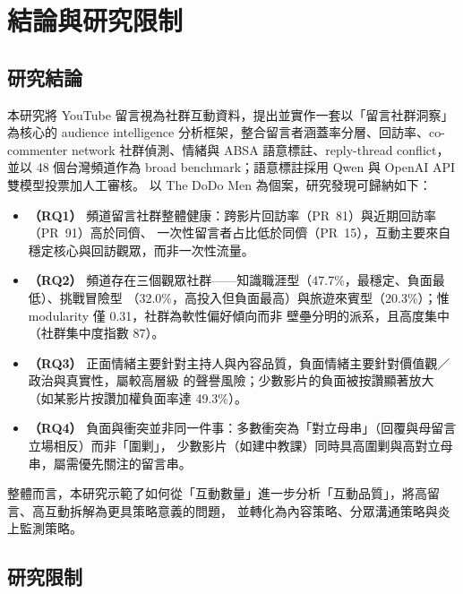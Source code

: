 \section{結論與研究限制}

\subsection{研究結論}

本研究將 YouTube 留言視為社群互動資料，提出並實作一套以「留言社群洞察」為核心的 audience intelligence
分析框架，整合留言者涵蓋率分層、回訪率、co-commenter network 社群偵測、情緒與 ABSA 語意標註、reply-thread
conflict，並以 48 個台灣頻道作為 broad benchmark；語意標註採用 Qwen 與 OpenAI API 雙模型投票加人工審核。
以 The DoDo Men 為個案，研究發現可歸納如下：

\begin{itemize}
  \item \textbf{（RQ1）} 頻道留言社群整體健康：跨影片回訪率（PR~81）與近期回訪率（PR~91）高於同儕、
        一次性留言者占比低於同儕（PR~15），互動主要來自穩定核心與回訪觀眾，而非一次性流量。
  \item \textbf{（RQ2）} 頻道存在三個觀眾社群——知識職涯型（47.7\%，最穩定、負面最低）、挑戰冒險型
        （32.0\%，高投入但負面最高）與旅遊來賓型（20.3\%）；惟 modularity 僅 0.31，社群為軟性偏好傾向而非
        壁壘分明的派系，且高度集中（社群集中度指數 87）。
  \item \textbf{（RQ3）} 正面情緒主要針對主持人與內容品質，負面情緒主要針對價值觀／政治與真實性，屬較高層級
        的聲譽風險；少數影片的負面被按讚顯著放大（如某影片按讚加權負面率達 49.3\%）。
  \item \textbf{（RQ4）} 負面與衝突並非同一件事：多數衝突為「對立母串」（回覆與母留言立場相反）而非「圍剿」，
        少數影片（如建中教課）同時具高圍剿與高對立母串，屬需優先關注的留言串。
\end{itemize}

整體而言，本研究示範了如何從「互動數量」進一步分析「互動品質」，將高留言、高互動拆解為更具策略意義的問題，
並轉化為內容策略、分眾溝通策略與炎上監測策略。

\subsection{研究限制}
\label{sec:limit}

